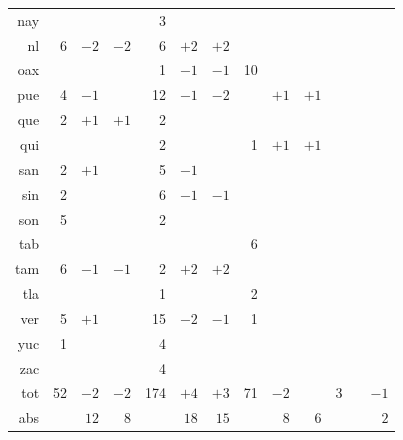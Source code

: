 \documentclass[letter,12pt]{article}
\begin{document}
\begin{table}
\begin{center}
\begin{tabular}{rrrr|rrr|rrr|rrr}
nay &     &     &     &   3 &     &     &      &      &       &    &    & \\       
 nl &   6 & $-2$& $-2$&   6 & $+2$& $+2$&      &      &       &    &    & \\       
oax &     &     &     &   1 & $-1$& $-1$&   10 &      &       &    &    & \\       \hdashline
pue &   4 & $-1$&     &  12 & $-1$& $-2$&      &  $+1$&  $+1$ &    &    & \\       
que &   2 & $+1$& $+1$&   2 &     &     &      &      &       &    &    & \\       
qui &     &     &     &   2 &     &     &    1 &  $+1$&  $+1$ &    &    & \\       
san &   2 & $+1$&     &   5 & $-1$&     &      &      &       &    &    & \\       \hdashline
sin &   2 &     &     &   6 & $-1$& $-1$&      &      &       &    &    & \\       
son &   5 &     &     &   2 &     &     &      &      &       &    &    & \\       
tab &     &     &     &     &     &     &    6 &      &       &    &    & \\       
tam &   6 & $-1$& $-1$&   2 & $+2$& $+2$&      &      &       &    &    & \\       \hdashline
tla &     &     &     &   1 &     &     &    2 &      &       &    &    & \\       
ver &   5 & $+1$&     &  15 & $-2$& $-1$&    1 &      &       &    &    & \\       
yuc &   1 &     &     &   4 &     &     &      &      &       &    &    & \\       
zac &     &     &     &   4 &     &     &      &      &       &    &    & \\ \hline
tot &  52 & $-2$& $-2$& 174 & $+4$& $+3$&   71 &  $-2$&       & 3  &    & $-1$ \\       
abs &     & $12$& $8$ &      &$18$& $15$&      &  $8$ &  $6$  &    &    & $2$  \\       

\end{tabular}
\end{center}
\end{table}
\end{document}
